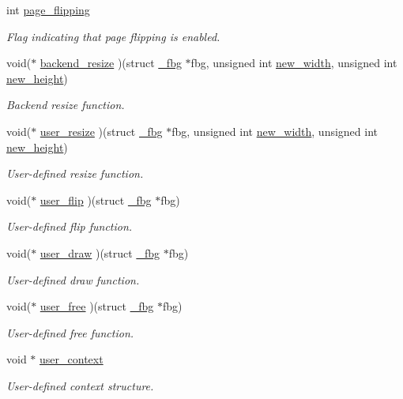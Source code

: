 \begin{DoxyCompactItemize}
int \mbox{\hyperlink{struct__fbg_ad32509bca6ac4fb467476834cb8ce9d2}{page\+\_\+flipping}}
\begin{DoxyCompactList}\small\item\em Flag indicating that page flipping is enabled. \end{DoxyCompactList}\item 
void($\ast$ \mbox{\hyperlink{struct__fbg_aef07a92ae059ea2a43653f4d0c5d928e}{backend\+\_\+resize}} )(struct \mbox{\hyperlink{struct__fbg}{\+\_\+fbg}} $\ast$fbg, unsigned int \mbox{\hyperlink{struct__fbg_a95859bd418a5cfff155cdb1421d295ef}{new\+\_\+width}}, unsigned int \mbox{\hyperlink{struct__fbg_a509aa5f8f0a94d8313bb4da777aa64bc}{new\+\_\+height}})
\begin{DoxyCompactList}\small\item\em Backend resize function. \end{DoxyCompactList}\item 
void($\ast$ \mbox{\hyperlink{struct__fbg_a68add70dac4b055809c1bcab1e65b18d}{user\+\_\+resize}} )(struct \mbox{\hyperlink{struct__fbg}{\+\_\+fbg}} $\ast$fbg, unsigned int \mbox{\hyperlink{struct__fbg_a95859bd418a5cfff155cdb1421d295ef}{new\+\_\+width}}, unsigned int \mbox{\hyperlink{struct__fbg_a509aa5f8f0a94d8313bb4da777aa64bc}{new\+\_\+height}})
\begin{DoxyCompactList}\small\item\em User-\/defined resize function. \end{DoxyCompactList}\item 
void($\ast$ \mbox{\hyperlink{struct__fbg_a3f2ad2eb06555cdbe2d18f541231cb37}{user\+\_\+flip}} )(struct \mbox{\hyperlink{struct__fbg}{\+\_\+fbg}} $\ast$fbg)
\begin{DoxyCompactList}\small\item\em User-\/defined flip function. \end{DoxyCompactList}\item 
void($\ast$ \mbox{\hyperlink{struct__fbg_ac66a762877982c6f381a7cfd54a8f17e}{user\+\_\+draw}} )(struct \mbox{\hyperlink{struct__fbg}{\+\_\+fbg}} $\ast$fbg)
\begin{DoxyCompactList}\small\item\em User-\/defined draw function. \end{DoxyCompactList}\item 
void($\ast$ \mbox{\hyperlink{struct__fbg_a88d48b502672cfb8bd2c94ea3feac8d0}{user\+\_\+free}} )(struct \mbox{\hyperlink{struct__fbg}{\+\_\+fbg}} $\ast$fbg)
\begin{DoxyCompactList}\small\item\em User-\/defined free function. \end{DoxyCompactList}\item 
void $\ast$ \mbox{\hyperlink{struct__fbg_ae3ecac18abee9dedabacaca9bb063bde}{user\+\_\+context}}
\begin{DoxyCompactList}\small\item\em User-\/defined context structure. \end{DoxyCompactList}\end{DoxyCompactItemize}


